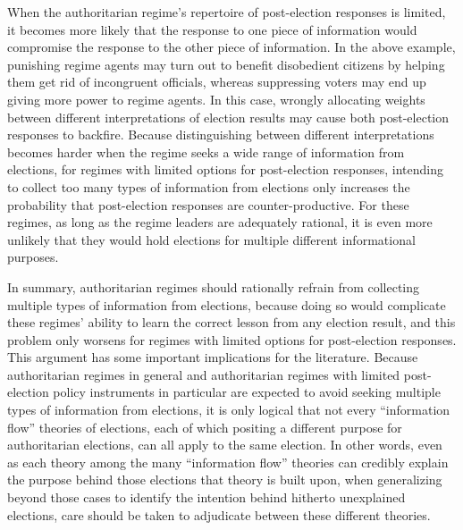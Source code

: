 \documentclass[12pt]{article}\usepackage[]{graphicx}\usepackage[]{color}
\newcommand{\1}{\mathbbm{1}}
\begin{document}
When the authoritarian regime's repertoire of post-election responses is limited, it becomes more likely that the response to one piece of information would compromise the response to the other piece of information. In the above example, punishing regime agents may turn out to benefit disobedient citizens by helping them get rid of incongruent officials, whereas suppressing voters may end up giving more power to regime agents. In this case, wrongly allocating weights between different interpretations of election results may cause both post-election responses to backfire. Because distinguishing between different interpretations becomes harder when the regime seeks a wide range of information from elections, for regimes with limited options for post-election responses, intending to collect too many types of information from elections only increases the probability that post-election responses are counter-productive. For these regimes, as long as the regime leaders are adequately rational, it is even more unlikely that they would hold elections for multiple different informational purposes. 

In summary, authoritarian regimes should rationally refrain from collecting multiple types of information from elections, because doing so would complicate these regimes' ability to learn the correct lesson from any election result, and this problem only worsens for regimes with limited options for post-election responses. This argument has some important implications for the literature. Because authoritarian regimes in general and authoritarian regimes with limited post-election policy instruments in particular are expected to avoid seeking multiple types of information from elections, it is only logical that not every ``information flow'' theories of elections, each of which positing a different purpose for authoritarian elections, can all apply to the same election. In other words, even as each theory among the many ``information flow'' theories can credibly explain the purpose behind those elections that theory is built upon, when generalizing beyond those cases to identify the intention behind hitherto unexplained elections, care should be taken to adjudicate between these different theories. 
\end{document}
